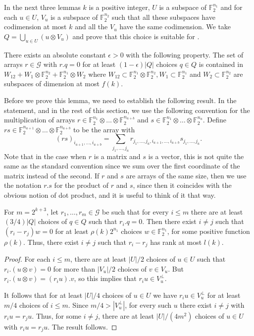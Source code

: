 \documentclass{toc}
\newcommand\eps{\epsilon}  %
\newcommand\F{\mathbb{F}}
\newcommand \cG{\mathcal G}
\newcommand \s{\subset}
\begin{document}
In the next three lemmas $k$ is a positive integer, $U$ is a subspace of $\F_2^{n_1}$ and for each $u\in U$, $V_u$ is a subspace of $\F_2^{n_2}$ such that all these subspaces have codimension at most $k$ and all the $V_u$ have the same codimension. We take $Q=\bigcup_{u\in U} (u\otimes V_u)$ and prove that this choice is suitable for .

\begin{lemma} \label{Qworks}
	There exists an absolute constant $\eps>0$ with the following property. The set of arrays $r\in \cG$ with $r.q=0$ for at least $(1-\eps)|Q|$ choices $q\in Q$ is contained in $W_{12}+W_1\otimes \F_2^{n_2}+\F_2^{n_1}\otimes W_2$ where $W_{12}\s \F_2^{n_1}\otimes \F_2^{n_2},W_1\s \F_2^{n_1}$ and $W_2\s \F_2^{n_2}$ are subspaces of dimension at most $f(k)$.
\end{lemma}

Before we prove this lemma, we need to establish the following result. In the statement, and in the rest of this section, we use the following convention for the multiplication of arrays $r\in \F_2^{n_1}\otimes \dots \otimes \F_2^{n_{a+b}}$ and $s\in \F_2^{n_1}\otimes \dots \otimes \F_2^{n_{a}}$. Define $rs\in \F_2^{n_{a+1}}\otimes \dots \otimes \F_2^{n_{a+b}}$ to be the array with
\[ (rs)_{i_{a+1},\dots,i_{a+b}}=\sum_{j_1,\dots,j_a}r_{j_1,\dots,j_a,i_{a+1},\dots,i_{a+b}}s_{j_1,\dots,j_a}.
\]
Note that in the case when $r$ is a matrix and $s$ is a vector, this
is not quite the same as the standard convention since we sum over the
first coordinate of the matrix instead of the second. If $r$ and $s$
are arrays of the same size, then we use the notation $r.s$ for the
product of $r$ and $s$, since then it coincides with the obvious
notion of dot product, and it is useful to think of it that way.

\begin{lemma} \label{smallrank}
	For $m=2^{k+3}$, let $r_1,\dots,r_m\in \cG$ be such that for every $i\leq m$ there are 
	at least $(3/4) |Q|$ choices of $q\in Q$ such that $r_i.q=0$. Then there exist $i\neq j$ such that $(r_i-r_j)w=0$ for at least $\rho(k)2^{n_1}$ choices $w\in \F_2^{n_1}$, for some positive function $\rho(k)$. Thus, there exist $i\neq j$ such that $r_i-r_j$ has rank at most $l(k)$.
\end{lemma}


\begin{proof}
  For each $i\leq m$, there are at least $|U|/2$ choices of $u\in U$
  such that $r_i.(u\otimes v)=0$ for more than $|V_u|/2$ choices of
  $v\in V_u$. But $r_i.(u\otimes v)=(r_iu).v$, so this implies that
  $r_iu\in V_u^\perp$.
	
	It follows that for at least $|U|/4$ choices of $u\in U$ we have $r_iu\in V_u^{\perp}$ for at least $m/4$ choices of $i\leq m$. Since $m/4>|V_u^{\perp}|$, for every such $u$ there exist $i\neq j$ with $r_iu=r_ju$. Thus, for some $i\neq j$, there are at least ${|U|}/{(4m^2)}$ choices of $u\in U$ with $r_iu=r_ju$. The result follows.
\end{proof}
\end{document}
